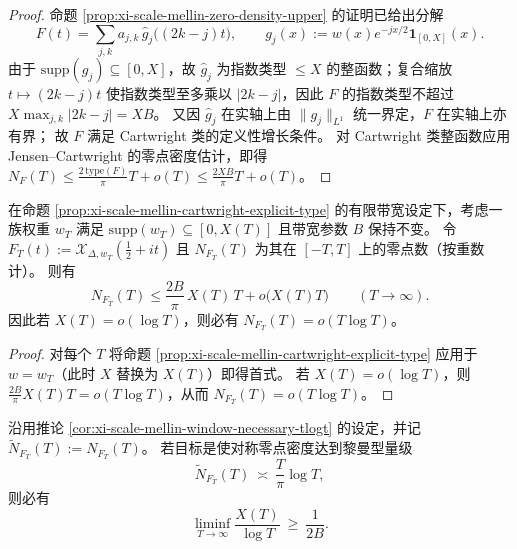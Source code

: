 \begin{proof}
命题 \ref{prop:xi-scale-mellin-zero-density-upper} 的证明已给出分解
\[
F(t)=\sum_{j,k}a_{j,k}\,\widehat g_j\bigl((2k-j)t\bigr),
\qquad
g_j(x):=w(x)e^{-jx/2}\mathbf 1_{[0,X]}(x).
\]
由于 \(\mathrm{supp}(g_j)\subseteq[0,X]\)，故 \(\widehat g_j\) 为指数类型 \(\le X\) 的整函数；复合缩放 \(t\mapsto (2k-j)t\) 使指数类型至多乘以 \(|2k-j|\)，因此 \(F\) 的指数类型不超过 \(X\max_{j,k}|2k-j|=XB\)。
又因 \(\widehat g_j\) 在实轴上由 \(\|g_j\|_{L^1}\) 统一界定，\(F\) 在实轴上亦有界；
故 \(F\) 满足 Cartwright 类的定义性增长条件。
对 Cartwright 类整函数应用 Jensen--Cartwright 的零点密度估计，即得
\(
N_F(T)\le \frac{2\,\mathrm{type}(F)}{\pi}T+o(T)\le \frac{2XB}{\pi}T+o(T)
\)。
\end{proof}

\begin{corollary}\label{cor:xi-scale-mellin-window-necessary-tlogt}
在命题 \ref{prop:xi-scale-mellin-cartwright-explicit-type} 的有限带宽设定下，考虑一族权重 \(w_T\) 满足
\(
\mathrm{supp}(w_T)\subseteq[0,X(T)]
\)
且带宽参数 \(B\) 保持不变。
令
\(
F_T(t):=\mathcal X_{\Delta,w_T}(\tfrac12+it)
\)
且 \(N_{F_T}(T)\) 为其在 \([-T,T]\) 上的零点数（按重数计）。
则有
\[
N_{F_T}(T)\le \frac{2B}{\pi}\,X(T)\,T+o\!\bigl(X(T)T\bigr)\qquad(T\to\infty).
\]
因此若 \(X(T)=o(\log T)\)，则必有 \(N_{F_T}(T)=o(T\log T)\)。
\end{corollary}

\begin{proof}
对每个 \(T\) 将命题 \ref{prop:xi-scale-mellin-cartwright-explicit-type} 应用于 \(w=w_T\)（此时 \(X\) 替换为 \(X(T)\)）即得首式。
若 \(X(T)=o(\log T)\)，则 \(\frac{2B}{\pi}X(T)T=o(T\log T)\)，从而 \(N_{F_T}(T)=o(T\log T)\)。
\end{proof}

\begin{corollary}\label{cor:xi-scale-mellin-window-width-lower-bound-1over2B}
沿用推论 \ref{cor:xi-scale-mellin-window-necessary-tlogt} 的设定，并记 \(\widetilde N_{F_T}(T):=N_{F_T}(T)\)。
若目标是使对称零点密度达到黎曼型量级
\[
\widetilde N_{F_T}(T)\ \asymp\ \frac{T}{\pi}\log T,
\]
则必有
\[
\liminf_{T\to\infty}\frac{X(T)}{\log T}\ \ge\ \frac{1}{2B}.
\]
\end{corollary}

